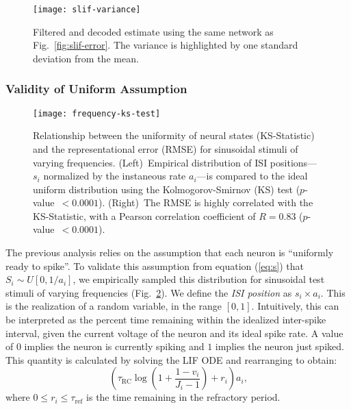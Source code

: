\begin{figure}[h!]
\centering
\texttt{[image: slif-variance]}
\caption{\label{fig:slif-variance} Filtered and decoded estimate using the same network as Fig.~\ref{fig:slif-error}. The variance is highlighted by one standard deviation from the mean.}
\end{figure}

\subsubsection{Validity of Uniform Assumption}

\begin{figure}[h!]
\centering
\texttt{[image: frequency-ks-test]}
\caption{\label{fig:frequency-ks-test}
  Relationship between the uniformity of neural states (KS-Statistic) and the representational error (RMSE) for sinusoidal stimuli of varying frequencies.
  (Left)~Empirical distribution of ISI positions---$s_i$ normalized by the instaneous rate $a_i$---is compared to the ideal uniform distribution using the Kolmogorov-Smirnov (KS) test ($p$-value~$< 0.0001$).
  (Right)~The RMSE is highly correlated with the KS-Statistic, with a Pearson correlation coefficient of $R = 0.83$ ($p$-value~$< 0.0001$).
}
\end{figure}

The previous analysis relies on the assumption that each neuron is ``uniformly ready to spike''.
To validate this assumption from equation (\ref{eq:s}) that $S_i \sim U[0, 1/a_i]$, we empirically sampled this distribution for sinusoidal test stimuli of varying frequencies (Fig.~\ref{fig:frequency-ks-test}).
We define the \emph{ISI position} as $s_i \times a_i$. This is the realization of a random variable, in the range $[0, 1]$.
Intuitively, this can be interpreted as the percent time remaining within the idealized inter-spike interval, given the current voltage of the neuron and its ideal spike rate.
A value of $0$ implies the neuron is currently spiking and $1$ implies the neuron just spiked.
This quantity is calculated by solving the LIF ODE and rearranging to obtain:
\begin{equation}
\left(\tau_\text{RC} \log\left(1 + \frac{1 - v_i}{J_i - 1}\right) + r_i \right) a_i \text{,}
\end{equation}
where $0 \le r_i \le \tau_\text{ref}$ is the time remaining in the refractory period.

